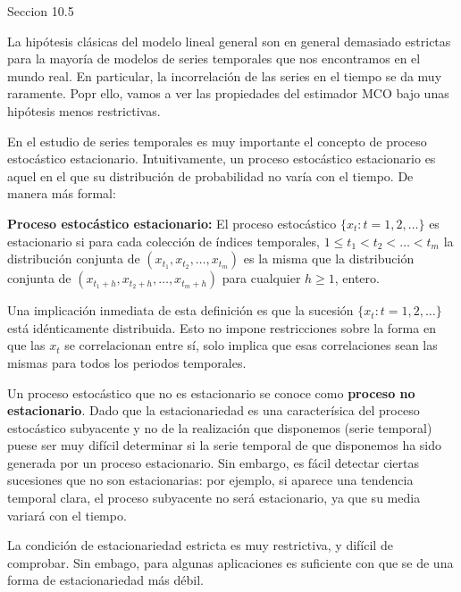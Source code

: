 



Seccion 10.5

La hip\'otesis cl\'asicas del modelo lineal general son en general demasiado estrictas para la mayor\'ia de modelos de series temporales que nos encontramos en el mundo real. En particular, la incorrelaci\'on de las series en el tiempo se da muy raramente. Popr ello, vamos a ver las propiedades del estimador MCO bajo unas hip\'otesis menos restrictivas.


En el estudio de series temporales es muy importante el concepto de proceso estoc\'astico estacionario. Intuitivamente, un proceso estoc\'astico estacionario es aquel en el que su distribuci\'on de probabilidad no var\'ia con el tiempo. De manera m\'as formal:

\begin{definicion}
\textbf{Proceso estoc\'astico estacionario:} El proceso estoc\'astico $\{x_t:t=1,2,\ldots\}$ es estacionario si para cada colecci\'on de \'indices temporales, $1\leq t_1<t_2<\ldots<t_m$ la distribuci\'on conjunta de $(x_{t_1},x_{t_2},\ldots,x_{t_m})$ es la misma que la distribuci\'on conjunta de $(x_{t_1+h},x_{t_2+h},\ldots,x_{t_m+h})$ para cualquier $h\geq1$, entero.
\end{definicion}

Una implicaci\'on inmediata de esta definici\'on es que la sucesi\'on $\{x_t:t=1,2,\ldots\}$ est\'a id\'enticamente distribuida. Esto no impone restricciones sobre la forma en que las $x_t$ se correlacionan entre s\'i, solo implica que esas correlaciones sean las mismas para todos los periodos temporales.

Un proceso estoc\'astico que no es estacionario se conoce como \textbf{proceso no estacionario}. Dado que la estacionariedad es una caracter\'isica del proceso estoc\'astico subyacente y no de la realizaci\'on que disponemos (serie temporal) puese ser muy dif\'icil determinar si la serie temporal de que disponemos ha sido generada por un proceso estacionario. Sin embargo, es f\'acil detectar ciertas sucesiones que no son estacionarias: por ejemplo, si aparece una tendencia temporal clara, el proceso subyacente no ser\'a estacionario, ya que su media variar\'a con el tiempo.

La condici\'on de estacionariedad estricta es muy restrictiva, y dif\'icil de comprobar. Sin embago, para algunas aplicaciones es suficiente con que se de una forma de estacionariedad m\'as d\'ebil.

